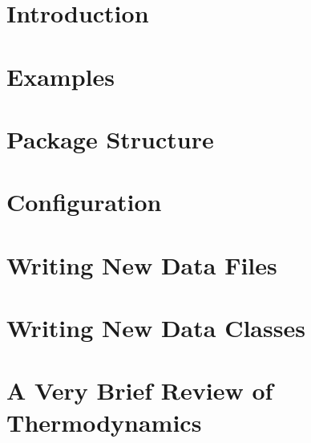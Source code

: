 \documentclass{book}
\begin{document}
\pagebreak

\tableofcontents
\mainmatter

\chapter{Introduction}\label{sec:intro}


\chapter{Examples}\label{sec:examples}


\chapter{Package Structure}\label{sec:struct}


\chapter{Configuration}\label{sec:config}


\chapter{Writing New Data Files}\label{sec:data}


\chapter{Writing New Data Classes}\label{sec:classes}


\appendix
\chapter{A Very Brief Review of Thermodynamics}\label{sec:thermo}

\end{document}
